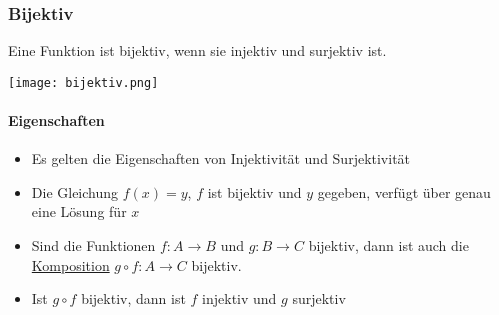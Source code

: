 \subsubsection{Bijektiv}
Eine Funktion ist bijektiv, wenn sie injektiv und surjektiv ist.

\texttt{[image: bijektiv.png]}

\paragraph{Eigenschaften}
\begin{itemize}
	\item Es gelten die Eigenschaften von Injektivität und Surjektivität
	\item Die Gleichung $f(x) = y$, $f$ ist bijektiv und $y$ gegeben, verfügt über genau eine Lösung für $x$
	\item Sind die Funktionen $f: A \rightarrow B$ und $g: B \rightarrow C$ bijektiv, dann ist auch die \underline{Komposition} $g \circ f: A \rightarrow C$ bijektiv.
	\item Ist $g \circ f$ bijektiv, dann ist $f$ injektiv und $g$ surjektiv
\end{itemize}
